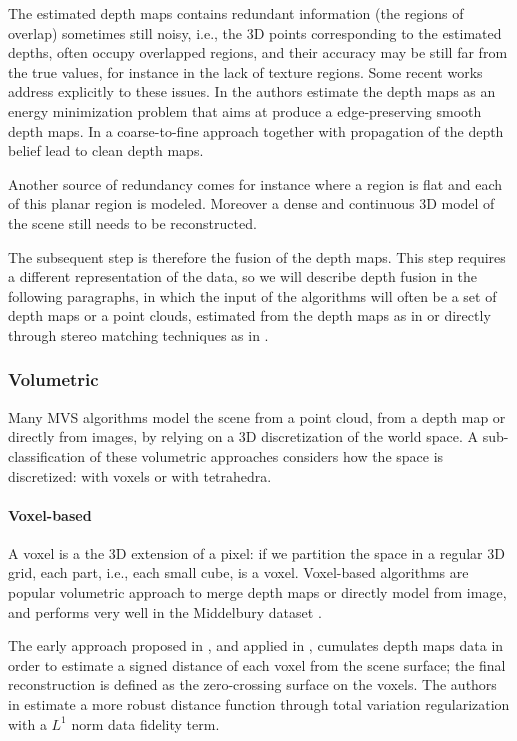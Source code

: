 The estimated depth maps contains redundant information (the regions of overlap) sometimes still noisy, i.e., the 3D points corresponding to the estimated depths, often occupy overlapped regions, and their accuracy may be still far from the true values, for instance in the lack of texture regions.
Some recent works address explicitly to these issues. 
In \cite{semerjian2014new} the authors estimate the depth maps as an energy minimization problem that aims at produce a edge-preserving smooth depth maps.
In \cite{wei2014multi} a coarse-to-fine approach together with propagation of the depth belief lead to clean depth maps.

Another source of redundancy comes for instance where a region is flat and each of this planar region is modeled. Moreover a dense and continuous 3D model of the scene still needs to be reconstructed.

The subsequent step is therefore the fusion of the depth maps. This step requires a different representation of the data, so we will describe depth fusion in the following paragraphs, in which the input of the algorithms will often be a set of depth maps or a point clouds, estimated from the depth maps  as in \cite{curless1996volumetric} or directly through stereo matching techniques as in \cite{bradley2008accurate,labatut2007efficient,vu_et_al_2012}.


\subsubsection{Volumetric}
Many MVS algorithms model the scene from a point cloud, from a depth map or directly from images, by relying on a 3D discretization of the world space.
A sub-classification of these volumetric approaches considers how the space is discretized: with voxels or with tetrahedra.


\paragraph{Voxel-based}
A voxel is a the 3D extension of a pixel: if we partition the space in a regular 3D grid, each part, i.e., each small cube, is a voxel.
Voxel-based  algorithms are popular volumetric approach to merge depth maps or directly model from image, and performs very well in the Middelbury dataset \cite{Seitz_et_al06}.

The early approach proposed in \cite{curless1996volumetric}, and applied in \cite{goesele2006multi}, cumulates depth maps data in order to estimate a signed distance of each voxel from the scene surface; the final reconstruction is defined as the zero-crossing surface on the voxels.
The authors in \cite{zach2007globally} estimate a more robust distance function through total variation regularization with a $L^1$ norm data fidelity term.

